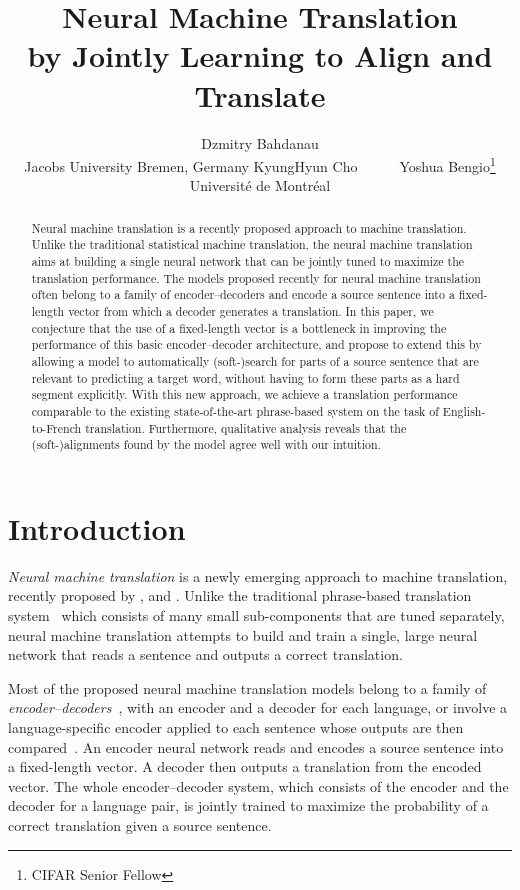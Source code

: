 \documentclass{article} %
\title{Neural Machine Translation \\ by Jointly Learning to Align and Translate}
\author{
Dzmitry Bahdanau \\
Jacobs University Bremen, Germany
\And
KyungHyun Cho~ ~ ~ ~Yoshua Bengio\thanks{CIFAR Senior Fellow} \\
Universit\'{e} de Montr\'{e}al
}
\begin{document}
\maketitle

\begin{abstract}
    Neural machine translation is a recently proposed approach to machine
    translation. Unlike the traditional statistical machine translation, the
    neural machine translation aims at building a single neural network that
    can be jointly tuned to maximize the translation performance. The models
    proposed recently for neural machine translation often belong to a family
    of encoder--decoders and encode a source sentence into a fixed-length
    vector from which a decoder generates a translation. In this paper, we
    conjecture that the use of a fixed-length vector is a bottleneck in
    improving the performance of this basic encoder--decoder architecture, and
    propose to extend this by allowing a model to automatically
    \mbox{(soft-)search} for parts of a source sentence that are relevant to
    predicting a target word, without having to form these parts as a hard
    segment explicitly. With this new approach, we achieve a translation
    performance comparable to the existing state-of-the-art phrase-based system
    on the task of English-to-French translation. Furthermore, qualitative
    analysis reveals that the \mbox{(soft-)alignments} found by the model agree
    well with our intuition.
\end{abstract}

\section{Introduction}

{\it Neural machine translation} is a newly emerging approach to machine
translation, recently proposed by \citet{Kalchbrenner2013},
\citet{Sutskever2014} and \citet{Cho2014a}. Unlike the traditional phrase-based
translation system~\citep[see, e.g.,][]{Koehn2003} which consists of many small
sub-components that are tuned separately, neural machine translation attempts
to build and train a single, large neural network that reads a sentence and
outputs a correct translation. 

Most of the proposed neural machine translation models belong to a family of
{\it encoder--decoders}~\citep{Sutskever2014,Cho2014}, with an encoder and a
decoder for each language, or involve a language-specific encoder applied to
each sentence whose outputs are then compared~\citep{Hermann2014}.  An encoder
neural network reads and encodes a source sentence into a fixed-length vector.
A decoder then outputs a translation from the encoded vector. The whole
encoder--decoder system, which consists of the encoder and the decoder for a
language pair, is jointly trained to maximize the probability of a correct
translation given a source sentence.
\end{document}
